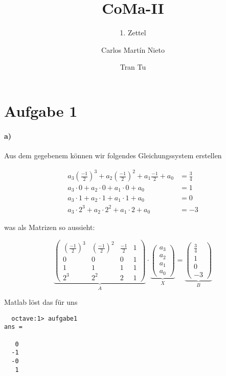 \documentclass[a4paper,ngerman]{scrartcl}
\begin{document}
\title{CoMa-II}
\subtitle{1. Zettel}
\author{Carlos Martín Nieto \and Tran Tu}
\maketitle

\section*{Aufgabe 1}
\paragraph{a)}
Aus dem gegebenem können wir folgendes Gleichungssystem erstellen

\begin{align*}
  a_3 \left(\frac{-1}{2}\right)^3 + a_2\left(\frac{-1}{2}\right)^2 + a_1\frac{-1}{2} + a_0 &= \frac{3}{4}\\
  a_3 \cdot 0 + a_2 \cdot 0 + a_1 \cdot 0 + a_0 &= 1\\
  a_3 \cdot 1 + a_2 \cdot 1 + a_1 \cdot 1 + a_0 &= 0\\
  a_3 \cdot 2^3+ a_2 \cdot 2^2+ a_1 \cdot 2+ a_0 &= -3
\end{align*}

was als Matrizen so aussieht:

\[
\underbrace{\begin{pmatrix}
  \left(\frac{-1}{2}\right)^3 & \left(\frac{-1}{2}\right)^2 & \frac{-1}{2} & 1\\
  0 & 0 & 0 & 1\\
  1 & 1 & 1 & 1\\
  2^3 & 2^2 & 2 & 1
\end{pmatrix}}_{A}\cdot
\underbrace{\begin{pmatrix}
  a_3\\ a_2\\ a_1\\ a_0
\end{pmatrix}}_{X} =
\underbrace{\begin{pmatrix}
  \frac{3}{4} \\ 1 \\ 0 \\ -3
\end{pmatrix}}_{B}
\]

Matlab löst das für uns

\begin{minipage}{0.4\linewidth}
\begin{lstlisting}
  octave:1> aufgabe1
ans =

   0
  -1
  -0
   1
\end{lstlisting}
\end{minipage}
\begin{minipage}{0.6\linewidth}
  
\end{minipage}
\end{document}

